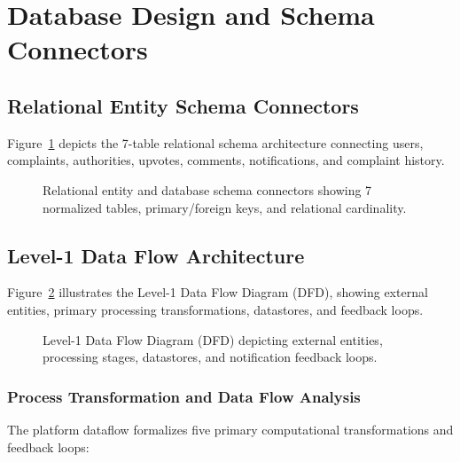 \documentclass[12pt,a4paper]{report}
\begin{document}
\section{Database Design and Schema Connectors}

\subsection{Relational Entity Schema Connectors}
Figure~\ref{fig:db_schema} depicts the 7-table relational schema architecture connecting users, complaints, authorities, upvotes, comments, notifications, and complaint history.

\begin{figure}[H]
    \centering
    \caption{Relational entity and database schema connectors showing 7 normalized tables, primary/foreign keys, and relational cardinality.}
    \label{fig:db_schema}
\end{figure}

\clearpage
\enlargethispage{2\baselineskip}
\subsection{Level-1 Data Flow Architecture}
Figure~\ref{fig:data_flow_diagram} illustrates the Level-1 Data Flow Diagram (DFD), showing external entities, primary processing transformations, datastores, and feedback loops.

\begin{figure}[H]
    \centering
    \vspace{-4pt}
    \vspace{-4pt}
    \caption{Level-1 Data Flow Diagram (DFD) depicting external entities, processing stages, datastores, and notification feedback loops.}
    \label{fig:data_flow_diagram}
\end{figure}

\vspace{-4pt}
\subsubsection{Process Transformation and Data Flow Analysis}
The platform dataflow formalizes five primary computational transformations and feedback loops:
\end{document}
